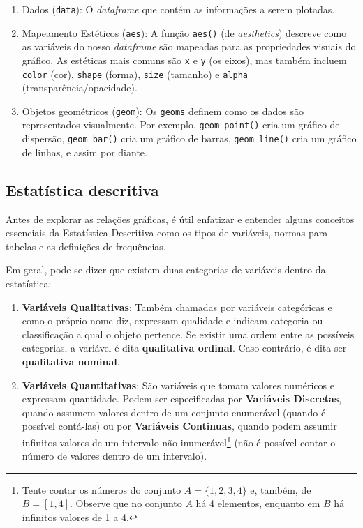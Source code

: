 \documentclass[
  12pt,
  letterpaper,
  DIV=11,
  numbers=noendperiod]{scrreprt}
\providecommand{\tightlist}{%
  \setlength{\itemsep}{0pt}\setlength{\parskip}{0pt}}\usepackage{longtable,booktabs,array}
\theoremstyle{definition}
\theoremstyle{exemplo}
\begin{document}
\begin{enumerate}
\def\labelenumi{\arabic{enumi}.}
\tightlist
\item
  Dados (\texttt{data}): O \emph{dataframe} que contém as informações a
  serem plotadas.
\item
  Mapeamento Estéticos (\texttt{aes}): A função \texttt{aes()} (de
  \emph{aesthetics}) descreve como as variáveis do nosso
  \emph{dataframe} são mapeadas para as propriedades visuais do gráfico.
  As estéticas mais comuns são \texttt{x} e \texttt{y} (os eixos), mas
  também incluem \texttt{color} (cor), \texttt{shape} (forma),
  \texttt{size} (tamanho) e \texttt{alpha} (transparência/opacidade).
\item
  Objetos geométricos (\texttt{geom}): Os \texttt{geoms} definem como os
  dados são representados visualmente. Por exemplo,
  \texttt{geom\_point()} cria um gráfico de dispersão,
  \texttt{geom\_bar()} cria um gráfico de barras, \texttt{geom\_line()}
  cria um gráfico de linhas, e assim por diante.
\end{enumerate}

\subsection{Estatística descritiva}\label{estatuxedstica-descritiva}

Antes de explorar as relações gráficas, é útil enfatizar e entender
alguns conceitos essenciais da Estatística Descritiva como os tipos de
variáveis, normas para tabelas e as definições de frequências.

Em geral, pode-se dizer que existem duas categorias de variáveis dentro
da estatística:

\begin{enumerate}
\def\labelenumi{\arabic{enumi}.}
\tightlist
\item
  \textbf{Variáveis Qualitativas}: Também chamadas por variáveis
  categóricas e como o próprio nome diz, expressam qualidade e indicam
  categoria ou classificação a qual o objeto pertence. Se existir uma
  ordem entre as possíveis categorias, a variável é dita
  \textbf{qualitativa ordinal}. Caso contrário, é dita ser
  \textbf{qualitativa nominal}.
\item
  \textbf{Variáveis Quantitativas}: São variáveis que tomam valores
  numéricos e expressam quantidade. Podem ser especificadas por
  \textbf{Variáveis Discretas}, quando assumem valores dentro de um
  conjunto enumerável (quando é possível contá-las) ou por
  \textbf{Variáveis Continuas}, quando podem assumir infinitos valores
  de um intervalo não inumerável\footnote{Tente contar os números do
    conjunto \(A = \{1,2,3,4\}\) e, também, de \(B = [1,4]\). Observe
    que no conjunto \(A\) há 4 elementos, enquanto em \(B\) há infinitos
    valores de 1 a 4.} (não é possível contar o número de valores dentro
  de um intervalo).
\end{enumerate}
\end{document}
